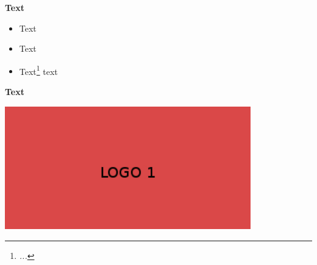 \begin{frame}[t,fragile] %
  \textbf{Text}

  \vfill
  {%
    \begin{itemize}
      \item<2-> Text
      \item<3-> Text
      \item<4-> Text\footnote<5->{\textit{...}} text
    \end{itemize}

    \medskip
    \java
  }
  \vfill
\end{frame}

\begin{frame}[t]
  \textbf{Text}

  \vfill
  {%
    \begin{center}
      \includegraphics[width=0.8\textwidth]{logo1.jpg}
    \end{center}
  }
\end{frame}